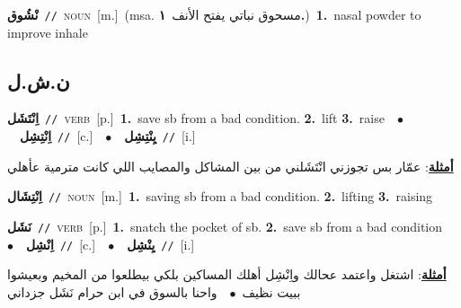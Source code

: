 \documentclass[10pt,a4paper,twoside]{article} %
\begin{document}
\begin{multicols}{2}
{\setlength\topsep{0pt}\textbf{\foreignlanguage{arabic}{نْشُوق}}\ {\color{gray}\texttt{//}\color{black}}\ \textsc{noun}\ [m.]\ \color{gray}(msa. \foreignlanguage{arabic}{مسحوق نباتي يفتح الأنف}~\foreignlanguage{arabic}{\textbf{١.}})\color{black}\ \textbf{1.}~nasal powder to improve inhale\ } \vspace{2mm}

\vspace{-3mm}
\subsection*{\color{blue}\foreignlanguage{arabic}{ن.ش.ل}\color{blue}{}} 

{\setlength\topsep{0pt}\textbf{\foreignlanguage{arabic}{اِنْتَشَل}}\ {\color{gray}\texttt{//}\color{black}}\ \textsc{verb}\ [p.]\ \textbf{1.}~save sb from a bad condition.  \textbf{2.}~lift  \textbf{3.}~raise\ \ $\bullet$\ \ \setlength\topsep{0pt}\textbf{\foreignlanguage{arabic}{اِنْتِشِل}}\ {\color{gray}\texttt{//}\color{black}}\ [c.]\ \ $\bullet$\ \ \setlength\topsep{0pt}\textbf{\foreignlanguage{arabic}{يِنْتِشِل}}\ {\color{gray}\texttt{//}\color{black}}\ [i.]\  \begin{flushright}\color{gray}\foreignlanguage{arabic}{\textbf{\underline{\foreignlanguage{arabic}{أمثلة}}}: عمّار بس تجوزني انْتَشَلني من بين المشاكل والمصايب اللي كانت مترمية عأهلي}\end{flushright}\color{black}} \vspace{2mm}

{\setlength\topsep{0pt}\textbf{\foreignlanguage{arabic}{اِنْتِشَال}}\ {\color{gray}\texttt{//}\color{black}}\ \textsc{noun}\ [m.]\ \textbf{1.}~saving sb from a bad condition.  \textbf{2.}~lifting  \textbf{3.}~raising\ } \vspace{2mm}

{\setlength\topsep{0pt}\textbf{\foreignlanguage{arabic}{نَشَل}}\ {\color{gray}\texttt{//}\color{black}}\ \textsc{verb}\ [p.]\ \textbf{1.}~snatch the pocket of sb.  \textbf{2.}~save sb from a bad condition\ \ $\bullet$\ \ \setlength\topsep{0pt}\textbf{\foreignlanguage{arabic}{اِنْشِل}}\ {\color{gray}\texttt{//}\color{black}}\ [c.]\ \ $\bullet$\ \ \setlength\topsep{0pt}\textbf{\foreignlanguage{arabic}{يِنْشِل}}\ {\color{gray}\texttt{//}\color{black}}\ [i.]\  \begin{flushright}\color{gray}\foreignlanguage{arabic}{\textbf{\underline{\foreignlanguage{arabic}{أمثلة}}}: اشتغل واعتمد عحالك واِنْشِل أهلك المساكين بلكي بيطلعوا من المخيم وبعيشوا ببيت نظيف\ $\bullet$\ \  واحنا بالسوق في ابن حرام نَشَل جزداني}\end{flushright}\color{black}} \vspace{2mm}


\end{multicols}
\end{document}

